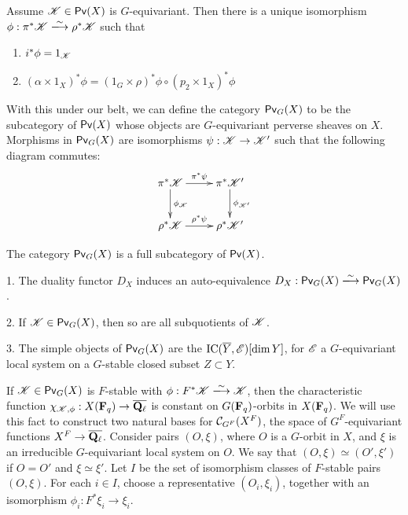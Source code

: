 \begin{lemm}
Assume $\mathscr{K}\in \operatorname{\mathsf{Pv}}(X)$ is $G$-equivariant. Then there is a unique 
isomorphism $\phi:\pi^\ast \sK \isomorphism \rho^\ast \sK$ such that 
\begin{enumerate}
  \item $i^\ast \phi = 1_{\mathscr{K}}$ 
  \item $(\alpha\times 1_X)^\ast \phi = (1_G\times \rho)^\ast \phi \circ (p_2\times 1_X)^\ast \phi$
\end{enumerate}
\end{lemm}

With this under our belt, we can define the category $\operatorname{\mathsf{Pv}}_G(X)$ to 
be the subcategory of $\operatorname{\mathsf{Pv}}(X)$ whose objects are $G$-equivariant 
perverse sheaves on $X$. Morphisms in $\operatorname{\mathsf{Pv}}_G(X)$ are isomorphisms 
$\psi:\mathscr{K}\to \mathscr{K}'$ such that the following diagram commutes:
\[\xymatrix{
  \pi^\ast \sK \ar[r]^-{\pi^\ast \psi} \ar[d]^-{\phi_\sK} 
    & \pi^\ast \sK' \ar[d]^-{\phi_{\sK'}} \\
  \rho^\ast \sK \ar[r]^-{\rho^\ast \psi} 
    & \rho^\ast \sK' 
}\]

\begin{lemm}
The category $\operatorname{\mathsf{Pv}}_G(X)$ is a full subcategory of $\operatorname{\mathsf{Pv}}(X)$. 
\end{lemm}

\begin{prop}
1. The duality functor $D_X$ induces an auto-equivalence 
$D_X:\perverse_G(X)\isomorphism \perverse_G(X)$. 

2. If $\mathscr{K}\in \operatorname{\mathsf{Pv}}_G(X)$, then so are all subquotients of $\mathscr{K}$. 

3. The simple objects of $\operatorname{\mathsf{Pv}}_G(X)$ are the 
$\operatorname{IC}(\overline Y,\mathscr{E})[\dim Y]$, for $\mathscr{E}$ a $G$-equivariant 
local system on a $G$-stable closed subset $Z\subset Y$. 
\end{prop}

If $\mathscr{K}\in \operatorname{\mathsf{Pv}}_G(X)$ is $F$-stable with $\phi:F^\ast \sK\isomorphism \sK$, 
then the characteristic function $\chi_{\mathscr{K},\phi}:X(\mathbf{F}_q) \to \overline{\mathbf{Q}_\ell}$ 
is constant on $G(\mathbf{F}_q)$-orbits in $X(\mathbf{F}_q)$. We will use this fact to construct 
two natural bases for $\mathcal{C}_{G^F}(X^F)$, the space of $G^F$-equivariant functions 
$X^F \to \overline{\mathbf{Q}_\ell}$. Consider pairs 
$(O,\xi)$, where $O$ is a $G$-orbit in $X$, and $\xi$ is an irreducible $G$-equivariant 
local system on $O$. We say that $(O,\xi)\simeq (O',\xi')$ if 
$O=O'$ and $\xi\simeq \xi'$. Let $I$ be the set of isomorphism classes of 
$F$-stable pairs $(O,\xi)$. For each $i\in I$, choose a representative 
$(O_i,\xi_i)$, together with an isomorphism 
$\phi_i:F^\ast \xi_i \to \xi_i$.  

